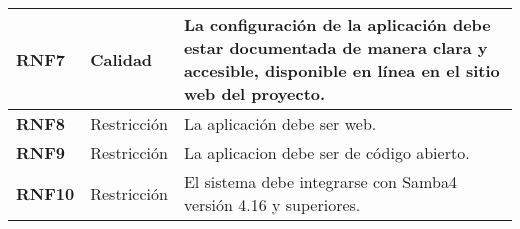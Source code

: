 \begin{longtable}{|l|l|p{12cm}|}
    \textbf{RNF7}   & Calidad            & La configuración de la aplicación debe estar documentada de manera clara y accesible, disponible en línea en el sitio web del proyecto.            \\ \hline
    \textbf{RNF8}   & Restricción        & La aplicación debe ser web.                                                                                                                        \\ \hline
    \textbf{RNF9}   & Restricción        & La aplicacion debe ser de código abierto.                                                                                                          \\ \hline
    \textbf{RNF10}  & Restricción        & El sistema debe integrarse con Samba4 versión 4.16 y superiores.                                                                     \\ \hline
\end{longtable}
